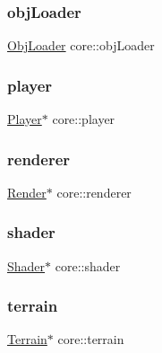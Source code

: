 \mbox{\label{namespacecore_abf1a2ebbee224aa2f7a35148ebcac1fb}} 
\subsubsection{\texorpdfstring{obj\+Loader}{objLoader}}
{\footnotesize\ttfamily \hyperlink{classcore_1_1ObjLoader}{Obj\+Loader} core\+::obj\+Loader}

\mbox{\label{namespacecore_a8130d7cf3bb04bc517651bc3855f8c0f}} 
\subsubsection{\texorpdfstring{player}{player}}
{\footnotesize\ttfamily \hyperlink{classentity_1_1Player}{Player}$\ast$ core\+::player}

\mbox{\label{namespacecore_a4f2740ccbefd3bb34c624a8c99d6446d}} 
\subsubsection{\texorpdfstring{renderer}{renderer}}
{\footnotesize\ttfamily \hyperlink{classcore_1_1Render}{Render}$\ast$ core\+::renderer}

\mbox{\label{namespacecore_adf2f7f5f951bd01b06d6c792d7bf301b}} 
\subsubsection{\texorpdfstring{shader}{shader}}
{\footnotesize\ttfamily \hyperlink{classshader_1_1Shader}{Shader}$\ast$ core\+::shader}

\mbox{\label{namespacecore_ac45da6f80dac9bead5c9310c27897f15}} 
\subsubsection{\texorpdfstring{terrain}{terrain}}
{\footnotesize\ttfamily \hyperlink{classterrain_1_1Terrain}{Terrain}$\ast$ core\+::terrain}

